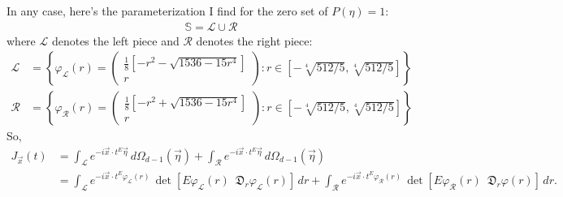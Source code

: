 \documentclass{article}
\theoremstyle{definition}
\newcommand{\lag}{\mathcal{L}}
\newcommand{\f}[2]{\frac{#1}{#2}}
\newcommand{\lb}{\left[}
\newcommand{\rb}{\right]}
\newcommand{\lc}{\left\{}
\newcommand{\rc}{\right\}}
\begin{document}
In any case, here's the parameterization I find for the zero set of $P(\eta) = 1$:
\begin{align*}
    \mathbb{S} = \lag \cup \mathcal{R}
\end{align*}
where $\lag$ denotes the left piece and $\mathcal{R}$ denotes the right piece:
\begin{align*}
    \lag &= \lc 
    \varphi_\lag(r) = \begin{pmatrix}
    \f{1}{8}\lb - r^2 - \sqrt{1536 - 15r^4} \rb \\ r
    \end{pmatrix}: r\in \lb -\sqrt[4]{512/5}, \sqrt[4]{512/5} \rb
    \rc\\
    \mathcal{R} &= \lc 
    \varphi_\mathcal{R}(r) = \begin{pmatrix}
    \f{1}{8}\lb - r^2 + \sqrt{1536 - 15r^4} \rb \\ r
    \end{pmatrix}: r\in \lb -\sqrt[4]{512/5}, \sqrt[4]{512/5} \rb
    \rc
\end{align*}
So, 
\begin{align*}
    J_{\vec{x}}(t) &= \int_{\lag} e^{-i \vec{x}\cdot t^E \vec{\eta}}\, d\Omega_{d-1}(\vec{\eta}) + \int_{\mathcal{R}} e^{-i \vec{x}\cdot t^E \vec{\eta}}\, d\Omega_{d-1}(\vec{\eta}) \\
    &= \int_{\lag} e^{-i \vec{x} \cdot t^E \varphi_{\lag}(r)}\, \det\lb E\varphi_{\lag}(r) \,\,\, \mathfrak{D}_r \varphi_{\lag}(r) \rb\, dr + \int_{\mathcal{R}} e^{-i \vec{x}\cdot t^E \varphi_{\mathcal{R}}(r)}\,  \det\lb E\varphi_{\mathcal{R}}(r) \,\,\, \mathfrak{D}_r \varphi(r) \rb\, dr.
\end{align*}
\end{document}
